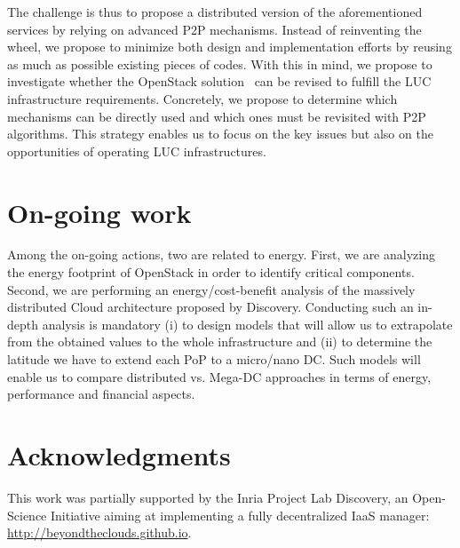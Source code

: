 \documentclass[conference]{IEEEtran}
\begin{document}
The challenge is thus to propose a distributed version of the
aforementioned services by relying on advanced P2P mechanisms.
Instead of reinventing the wheel, we propose to minimize both design
and implementation efforts by reusing as much as possible existing
pieces of codes. With this in mind, we propose to investigate whether
the OpenStack solution~\cite{openstack} can be revised to fulfill
the LUC infrastructure requirements. Concretely, we propose to
determine which mechanisms can be directly used and which ones must be
revisited with P2P algorithms. This strategy enables us to focus on the key issues but also on the opportunities of operating LUC infrastructures.


\section{On-going work}
Among the on-going actions, two are related to energy. First,  we are 
analyzing the energy footprint of OpenStack in order to identify critical components.
Second, we are performing an energy/cost-benefit
analysis of the massively distributed Cloud architecture proposed by Discovery. Conducting such an in-depth analysis is mandatory (i) to
design models that will allow us to extrapolate from the obtained values to the
whole infrastructure and (ii) to determine the latitude we have to extend each
PoP to a micro/nano DC. Such models will enable us to compare distributed vs.
Mega-DC approaches in terms of energy, performance and financial aspects.

\vspace*{-.1cm}
\section*{Acknowledgments}
This work was partially supported by the Inria Project Lab Discovery, an Open-Science Initiative aiming at implementing a fully decentralized IaaS manager: \url{http://beyondtheclouds.github.io}.
\vspace*{-.4cm}



\end{document}
